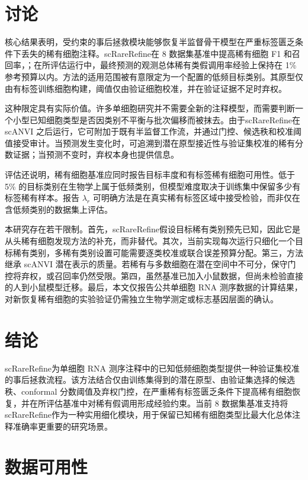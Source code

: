 \documentclass[pdflatex,sn-mathphys-num]{sn-jnl}
\theoremstyle{thmstyleone}%
\theoremstyle{thmstyletwo}%
\theoremstyle{thmstylethree}%
\newcommand{\method}{scRareRefine}
\newcommand{\rare}{r}
\begin{document}
\section{讨论}

核心结果表明，受约束的事后拯救模块能够恢复半监督骨干模型在严重标签匮乏条件下丢失的稀有细胞注释。\method 在 8 数据集基准中提高稀有细胞 F1 和召回率，；在所评估运行中，最终预测的观测总体稀有类假调用率经验上保持在 1\% 参考预算以内。方法的适用范围被有意限定为一个配置的低频目标类别。其原型仅由有标签训练细胞构建，阈值仅由验证细胞校准，并在验证证据不足时弃权。

这种限定具有实际价值。许多单细胞研究并不需要全新的注释模型，而需要判断一个小型已知细胞类型是否因类别不平衡与批次偏移而被抹去。由于\method 在 scANVI 之后运行，它可附加于既有半监督工作流，并通过门控、候选秩和校准阈值接受审计。当预测发生变化时，可追溯到潜在原型接近性与验证集校准的稀有分数证据；当预测不变时，弃权本身也提供信息。

评估还说明，稀有细胞基准应同时报告目标丰度和有标签稀有细胞可用性。低于 5\% 的目标类别在生物学上属于低频类别，但模型难度取决于训练集中保留多少有标签稀有样本。报告 $\lambda_\rare$ 可明确方法是在真实稀有标签区域中接受检验，而非仅在含低频类别的数据集上评估。

本研究存在若干限制。首先，\method 假设目标稀有类别预先已知，因此它是从头稀有细胞发现方法的补充，而非替代。其次，当前实现每次运行只细化一个目标稀有类别，多稀有类别设置可能需要逐类校准或联合误差预算分配。第三，方法继承 scANVI 潜在表示的质量。若稀有与多数细胞在潜在空间中不可分，保守门控将弃权，或召回率仍然受限。第四，虽然基准已加入小鼠数据，但尚未检验直接的人到小鼠模型迁移。最后，本文仅报告公共单细胞 RNA 测序数据的计算结果，对新恢复稀有细胞的实验验证仍需独立生物学测定或标志基因层面的确认。

\section{结论}

\method 为单细胞 RNA 测序注释中的已知低频细胞类型提供一种验证集校准的事后拯救流程。该方法结合仅由训练集得到的潜在原型、由验证集选择的候选秩、conformal 分数阈值及弃权门控，在严重稀有标签匮乏条件下提高稀有细胞恢复，并在所评估基准中对稀有假调用形成经验约束。当前 8 数据集基准支持将\method 作为一种实用细化模块，用于保留已知稀有细胞类型比最大化总体注释准确率更重要的研究场景。

\backmatter

\section*{数据可用性}
\end{document}
